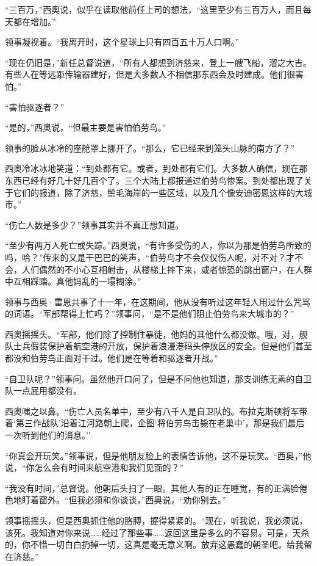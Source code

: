 \documentclass[AutoFakeBold=true]{book}
\begin{document}
``三百万，''西奥说，似乎在读取他前任上司的想法，``这里至少有三百万人，而且每天都在增加。''

领事凝视着。``我离开时，这个星球上只有四百五十万人口啊。''

``现在仍旧是，''新任总督说道，``所有人都想到济慈来，登上一艘飞船，溜之大吉。有些人在等远距传输器建好，但是大多数人不相信那东西会及时建成。他们很害怕。''

``害怕驱逐者？''

``是的，''西奥说，``但最主要是害怕伯劳鸟。''

领事的脸从冰冷的座舱罩上挪开了。``那么，它已经来到笼头山脉的南方了？''

西奥冷冰冰地笑道：``到处都有它。或者，到处都有它们。大多数人确信，现在那东西已经有好几十好几百个了。三个大陆上都报道过伯劳鸟惨案。到处都出现了关于它们的报道，除了济慈，鬃毛海岸的一些区域，以及几个像安迪密恩这样的大城市。''

``伤亡人数是多少？''领事其实并不真正想知道。

``至少有两万人死亡或失踪。''西奥说，``有许多受伤的人，你以为那是伯劳鸟所致的吗，哈？''传来的又是干巴巴的笑声，``伯劳鸟才不会仅仅伤人呢，对不对？才不会，人们偶然的不小心互相射击，从楼梯上摔下来，或者惊恐的跳出窗户，在人群中互相踩踏。真他妈乱的一塌糊涂。''

领事与西奥·雷恩共事了十一年，在这期间，他从没有听过这年轻人用过什么咒骂的词语。``军部帮得上忙吗？''领事问，``是不是他们阻止伯劳鸟来大城市的？''

西奥摇摇头。``军部，他们除了控制住暴徒，他妈的其他什么都没做。哦，对，舰队士兵假装保护着航空港的开放，保护着浪漫港码头停放区的安全。但是他们甚至都没和伯劳鸟正面对干过。他们是在等着和驱逐者开战。''

``自卫队呢？''领事问。虽然他开口问了，但是不问他也知道，那支训练无素的自卫队一点屁用都没有。

西奥嗤之以鼻。``伤亡人员名单中，至少有八千人是自卫队的。布拉克斯顿将军带着`第三作战队'沿着江河路朝上爬，企图`将伯劳鸟击毙在老巢中'，那是我们最后一次听到他们的消息。''

``你真会开玩笑。''领事说，但是他朋友脸上的表情告诉他，这不是玩笑。``西奥，''他说，``你怎么会有时间来航空港和我们见面的？''

``我没有时间，''总督说。他朝后头扫了一眼。其他人有的正在睡觉，有的正满脸倦色地盯着窗外。``但我必须和你谈谈，''西奥说，``劝你别去。''

领事摇摇头，但是西奥抓住他的胳膊，握得紧紧的。``现在，听我说，我必须说，该死。我知道对你来说……经过了那些事……返回这里是多么的不容易。可是，天杀的，你不惜一切白白扔掉一切，这真是毫无意义啊。放弃这愚蠢的朝圣吧。给我留在济慈。''
\end{document}
